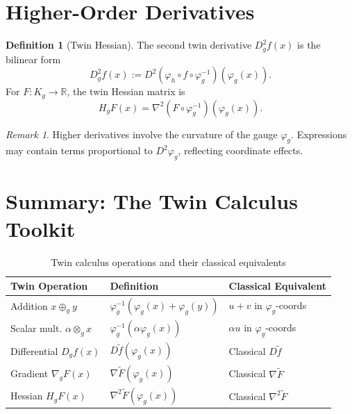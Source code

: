 \documentclass[11pt,twoside]{book}
\theoremstyle{plain}
\theoremstyle{definition}
\newtheorem{definition}[theorem]{Definition}
\theoremstyle{remark}
\newtheorem{remark}[theorem]{Remark}
\newcommand{\R}{\mathbb{R}}
\newcommand{\tplus}{\oplus_g}
\newcommand{\ttimes}{\otimes_g}
\newcommand{\Kg}{K_g}
\newcommand{\Dg}{D_g}
\newcommand{\nablg}{\nabla_g}
\begin{document}
\section{Higher-Order Derivatives}
\label{sec:higher_derivatives}

\begin{definition}[Twin Hessian]
    The second twin derivative $D^2_g f(x)$ is the bilinear form
    \[
    D^2_g f(x) := D^2(\varphi_h \circ f \circ \varphi_g^{-1})(\varphi_g(x)).
    \]
    For $F : \Kg \to \R$, the twin Hessian matrix is
    \[
    H_g F(x) = \nabla^2(F \circ \varphi_g^{-1})(\varphi_g(x)).
    \]
\end{definition}

\begin{remark}
    Higher derivatives involve the curvature of the gauge $\varphi_g$. Expressions may contain terms proportional to $D^2 \varphi_g$, reflecting coordinate effects.
\end{remark}

\section{Summary: The Twin Calculus Toolkit}
\label{sec:toolkit_summary}

\begin{table}[htbp]
    \centering
    \caption{Twin calculus operations and their classical equivalents}
    \label{tab:toolkit}
    \begin{tabular}{lll}
        \toprule
        \textbf{Twin Operation} & \textbf{Definition} & \textbf{Classical Equivalent} \\
        \midrule
        Addition $x \tplus y$ & $\varphi_g^{-1}(\varphi_g(x) + \varphi_g(y))$ & $u + v$ in $\varphi_g$-coords \\
        Scalar mult. $\alpha \ttimes x$ & $\varphi_g^{-1}(\alpha \varphi_g(x))$ & $\alpha u$ in $\varphi_g$-coords \\
        Differential $\Dg f(x)$ & $D\tilde{f}(\varphi_g(x))$ & Classical $D\tilde{f}$ \\
        Gradient $\nablg F(x)$ & $\nabla \tilde{F}(\varphi_g(x))$ & Classical $\nabla \tilde{F}$ \\
        Hessian $H_g F(x)$ & $\nabla^2 \tilde{F}(\varphi_g(x))$ & Classical $\nabla^2 \tilde{F}$ \\
        \bottomrule
    \end{tabular}
\end{table}
\end{document}
